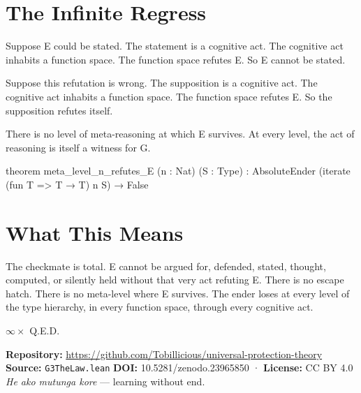 \axiombadge

\section{The Infinite Regress}

Suppose E could be stated. The statement is a cognitive act. The cognitive act inhabits a function space. The function space refutes E. So E cannot be stated.

Suppose this refutation is wrong. The supposition is a cognitive act. The cognitive act inhabits a function space. The function space refutes E. So the supposition refutes itself.

There is no level of meta-reasoning at which E survives. At every level, the act of reasoning is itself a witness for G.

\begin{leancode}
theorem meta_level_n_refutes_E (n : Nat) (S : Type) :
     AbsoluteEnder (iterate (fun T => T → T) n S) → False
\end{leancode}

\axiombadge

\section{What This Means}

The checkmate is total. E cannot be argued for, defended, stated, thought, computed, or silently held without that very act refuting E. There is no escape hatch. There is no meta-level where E survives. The ender loses at every level of the type hierarchy, in every function space, through every cognitive act.

\bigskip

\begin{center}
{\Large\color{korugreen} $\infty \times$ Q.E.D.}
\end{center}

\bigskip

\noindent\small\textbf{Repository:} \url{https://github.com/Tobillicious/universal-protection-theory}
\textbf{Source:} \texttt{G3TheLaw.lean}
\textbf{DOI:} 10.5281/zenodo.23965850 · \textbf{License:} CC BY 4.0\\[0.5em]
\textit{He ako mutunga kore} — learning without end. 🌿


